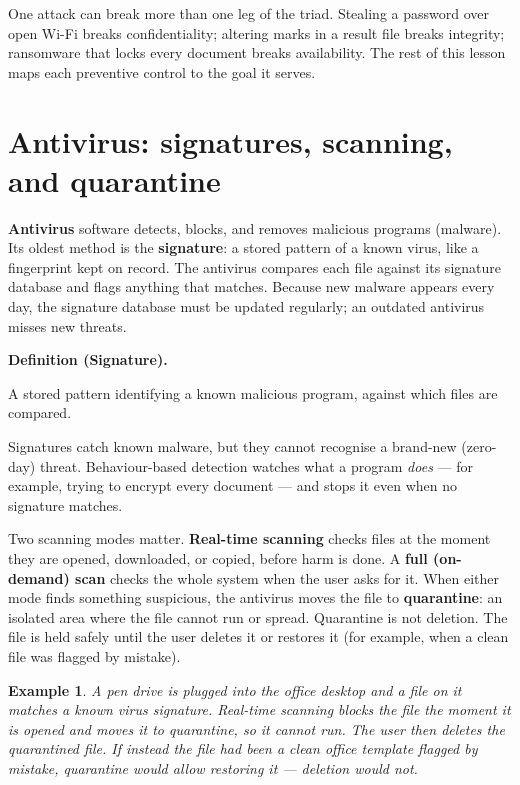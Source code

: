 \documentclass[11pt]{article}
\newtheorem{example}{Example}[section]
\newenvironment{definitionbox}[1]{%
  \par\noindent\textbf{Definition (#1).}\ \itshape
}{\par\vspace{0.3em}}
\begin{document}
One attack can break more than one leg of the triad. Stealing a password over
open Wi-Fi breaks confidentiality; altering marks in a result file breaks
integrity; ransomware that locks every document breaks availability. The rest
of this lesson maps each preventive control to the goal it serves.

\section{Antivirus: signatures, scanning, and quarantine}
\textbf{Antivirus} software detects, blocks, and removes malicious programs
(malware). Its oldest method is the \textbf{signature}: a stored pattern of a
known virus, like a fingerprint kept on record. The antivirus compares each
file against its signature database and flags anything that matches. Because
new malware appears every day, the signature database must be updated
regularly; an outdated antivirus misses new threats.

\begin{definitionbox}{Signature}
A stored pattern identifying a known malicious program, against which files
are compared.
\end{definitionbox}

Signatures catch known malware, but they cannot recognise a brand-new
(zero-day) threat. Behaviour-based detection watches what a program
\emph{does} --- for example, trying to encrypt every document --- and stops
it even when no signature matches.

Two scanning modes matter. \textbf{Real-time scanning} checks files at the
moment they are opened, downloaded, or copied, before harm is done. A
\textbf{full (on-demand) scan} checks the whole system when the user asks for
it. When either mode finds something suspicious, the antivirus moves the file
to \textbf{quarantine}: an isolated area where the file cannot run or spread.
Quarantine is not deletion. The file is held safely until the user deletes it
or restores it (for example, when a clean file was flagged by mistake).

\begin{example}
A pen drive is plugged into the office desktop and a file on it matches a
known virus signature. Real-time scanning blocks the file the moment it is
opened and moves it to quarantine, so it cannot run. The user then deletes the
quarantined file. If instead the file had been a clean office template flagged
by mistake, quarantine would allow restoring it --- deletion would not.
\end{example}
\end{document}
